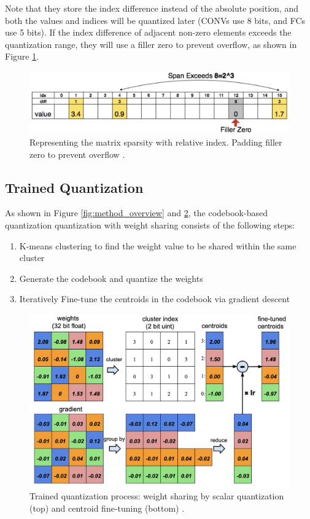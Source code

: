 \documentclass[12pt]{article}
\begin{document}
Note that they store the index difference instead of the absolute position, and both the values and indices will be quantized later (CONVs use 8 bits, and FCs use 5 bits). If the index difference of adjacent non-zero elements exceeds the quantization range, they will use a filler zero to prevent overflow, as shown in Figure \ref{fig:filter_zero}.

\begin{figure}
    \centering
    \includegraphics[width=0.8\linewidth]{images/f2_filter_zero.png}
    \caption{Representing the matrix sparsity with relative index. Padding filler zero to prevent overflow \cite{han2015deep_compression}.}
    \label{fig:filter_zero}
\end{figure}

\subsection{Trained Quantization}

As shown in Figure \ref{fig:method_overview} and \ref{fig:weight_share}, the codebook-based quantization quantization with weight sharing consists of the following steps:

\begin{enumerate}
    \item K-means clustering to find the weight value to be shared within the same cluster
    \item Generate the codebook and quantize the weights
    \item Iteratively Fine-tune the centroids in the codebook via gradient descent
\end{enumerate}

\begin{figure}
    \centering
    \includegraphics[width=0.8\linewidth]{images/f3_weight_share.png}
    \caption{Trained quantization process: weight sharing by scalar quantization (top) and centroid fine-tuning (bottom) \cite{han2015deep_compression}.}
    \label{fig:weight_share}
\end{figure}
\end{document}
